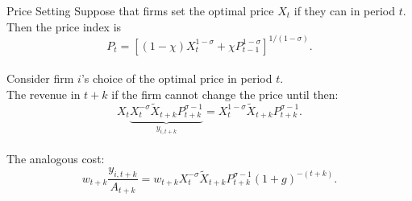 \documentclass[9pt]{beamer}
\begin{document}
\begin{frame}{Price Setting}
    Suppose that firms set the optimal price $X_{t}$ if they can in period $t$.\\
    \bigskip
    Then the price index is
    \begin{equation}
        P_{t}=\left[(1-\chi)X_{t}^{1-\sigma}+\chi P_{t-1}^{1-\sigma} \right]^{1/(1-\sigma)}.
    \end{equation}\\
    \bigskip
    Consider firm $i$'s choice of the optimal price in period $t$.\\
    \bigskip
    The revenue in $t+k$ if the firm cannot change the price until then:
    \begin{equation}
        X_{t}\underbrace{X_{t}^{-\sigma}\tilde{X}_{t+k}P_{t+k}^{\sigma-1}}_{y_{i,t+k}}=X_{t}^{1-\sigma}\tilde{X}_{t+k}P_{t+k}^{\sigma-1}.
    \end{equation}\\
    The analogous cost:
    \begin{equation}
        w_{t+k}\frac{y_{i,t+k}}{A_{t+k}}=w_{t+k}X_{t}^{-\sigma}\tilde{X}_{t+k}P_{t+k}^{\sigma-1}(1+g)^{-(t+k)}.
    \end{equation}
\end{frame}








\end{document}
